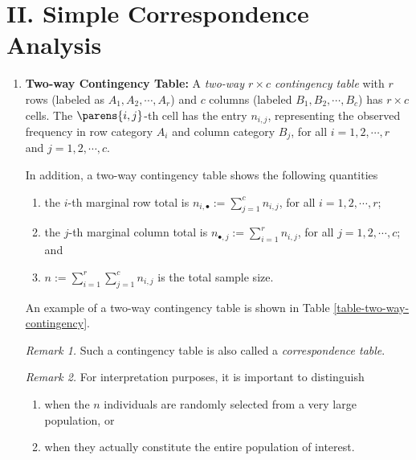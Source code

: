 \documentclass[12pt]{article}
\begin{document}
\section*{II. Simple Correspondence Analysis}

\begin{enumerate}[label=\textbf{\arabic*.}]
	
	\item \textbf{Two-way Contingency Table:} A \emph{two-way $r \times c$ contingency table} with $r$ rows (labeled as $A_1, A_2, \cdots, A_r$) and $c$ columns (labeled $B_1, B_2, \cdots, B_c$) has $r \times c$ cells. The $\parens{i, j}$-th cell has the entry $n_{i,j}$, representing the observed frequency in row category $A_i$ and column category $B_j$, for all $i = 1, 2, \cdots, r$ and $j = 1, 2, \cdots, c$. 
	
	In addition, a two-way contingency table shows the following quantities 
	\begin{enumerate}
		\item the $i$-th marginal row total is $n_{i, \bullet} := \sum_{j=1}^c n_{i,j}$, for all $i = 1, 2, \cdots, r$; 
		\item the $j$-th marginal column total is $n_{\bullet, j} := \sum_{i=1}^r n_{i,j}$, for all $j = 1, 2, \cdots, c$; and 
		\item $n := \sum_{i=1}^r \sum_{j=1}^c n_{i,j}$ is the total sample size. 
	\end{enumerate}
	An example of a two-way contingency table is shown in Table \ref{table-two-way-contingency}. 
	
	\textit{Remark 1.} Such a contingency table is also called a \emph{correspondence table}. 
	
	\textit{Remark 2.} For interpretation purposes, it is important to distinguish 
	\begin{enumerate}
		\item when the $n$ individuals are randomly selected from a very large population, or 
		\item when they actually constitute the entire population of interest. 
	\end{enumerate}
	

\end{enumerate}
\end{document}
